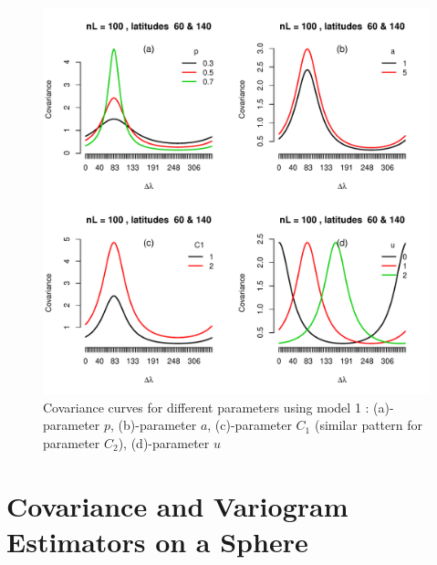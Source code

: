 			\begin{figure}
				\centering
				\includegraphics[width=1\textwidth]{graphs/parameters_model1_2}
				\caption[Covariance Curves for Different Parameters using Model1:] {Covariance curves for different parameters using model 1 \citep{Huang2012}:  (a)-parameter $p$, (b)-parameter $a$, (c)-parameter $C_1$ (similar pattern for parameter $C_2$), (d)-parameter $u$}
				\label{fig_parameter_comp}
			\end{figure}
			

\section{Covariance and Variogram Estimators on a Sphere}


